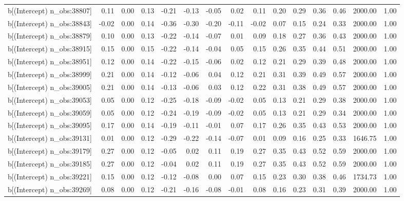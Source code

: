 \begin{table}[ht]
\begin{tabular}{rrrrrrrrrrrrrrr}
  b[(Intercept) n\_obs:38807] & 0.11 & 0.00 & 0.13 & -0.21 & -0.13 & -0.05 & 0.02 & 0.11 & 0.20 & 0.29 & 0.36 & 0.46 & 2000.00 & 1.00 \\ 
  b[(Intercept) n\_obs:38843] & -0.02 & 0.00 & 0.14 & -0.36 & -0.30 & -0.20 & -0.11 & -0.02 & 0.07 & 0.15 & 0.24 & 0.33 & 2000.00 & 1.00 \\ 
  b[(Intercept) n\_obs:38879] & 0.10 & 0.00 & 0.13 & -0.22 & -0.14 & -0.07 & 0.01 & 0.09 & 0.18 & 0.27 & 0.36 & 0.43 & 2000.00 & 1.00 \\ 
  b[(Intercept) n\_obs:38915] & 0.15 & 0.00 & 0.15 & -0.22 & -0.14 & -0.04 & 0.05 & 0.15 & 0.26 & 0.35 & 0.44 & 0.51 & 2000.00 & 1.00 \\ 
  b[(Intercept) n\_obs:38951] & 0.12 & 0.00 & 0.14 & -0.22 & -0.15 & -0.06 & 0.02 & 0.12 & 0.21 & 0.29 & 0.39 & 0.48 & 2000.00 & 1.00 \\ 
  b[(Intercept) n\_obs:38999] & 0.21 & 0.00 & 0.14 & -0.12 & -0.06 & 0.04 & 0.12 & 0.21 & 0.31 & 0.39 & 0.49 & 0.57 & 2000.00 & 1.00 \\ 
  b[(Intercept) n\_obs:39005] & 0.21 & 0.00 & 0.14 & -0.13 & -0.06 & 0.03 & 0.12 & 0.22 & 0.31 & 0.38 & 0.49 & 0.57 & 2000.00 & 1.00 \\ 
  b[(Intercept) n\_obs:39053] & 0.05 & 0.00 & 0.12 & -0.25 & -0.18 & -0.09 & -0.02 & 0.05 & 0.13 & 0.21 & 0.29 & 0.38 & 2000.00 & 1.00 \\ 
  b[(Intercept) n\_obs:39059] & 0.05 & 0.00 & 0.12 & -0.24 & -0.19 & -0.09 & -0.02 & 0.05 & 0.13 & 0.21 & 0.29 & 0.34 & 2000.00 & 1.00 \\ 
  b[(Intercept) n\_obs:39095] & 0.17 & 0.00 & 0.14 & -0.19 & -0.11 & -0.01 & 0.07 & 0.17 & 0.26 & 0.35 & 0.43 & 0.53 & 2000.00 & 1.00 \\ 
  b[(Intercept) n\_obs:39131] & 0.01 & 0.00 & 0.12 & -0.29 & -0.22 & -0.14 & -0.07 & 0.01 & 0.09 & 0.16 & 0.25 & 0.33 & 1646.75 & 1.00 \\ 
  b[(Intercept) n\_obs:39179] & 0.27 & 0.00 & 0.12 & -0.05 & 0.02 & 0.11 & 0.19 & 0.27 & 0.35 & 0.43 & 0.52 & 0.59 & 2000.00 & 1.00 \\ 
  b[(Intercept) n\_obs:39185] & 0.27 & 0.00 & 0.12 & -0.04 & 0.02 & 0.11 & 0.19 & 0.27 & 0.35 & 0.43 & 0.52 & 0.59 & 2000.00 & 1.00 \\ 
  b[(Intercept) n\_obs:39221] & 0.15 & 0.00 & 0.12 & -0.12 & -0.08 & 0.00 & 0.07 & 0.15 & 0.23 & 0.30 & 0.38 & 0.46 & 1734.73 & 1.00 \\ 
  b[(Intercept) n\_obs:39269] & 0.08 & 0.00 & 0.12 & -0.21 & -0.16 & -0.08 & -0.01 & 0.08 & 0.16 & 0.23 & 0.31 & 0.39 & 2000.00 & 1.00 \\ 

\end{tabular}
\end{table}
